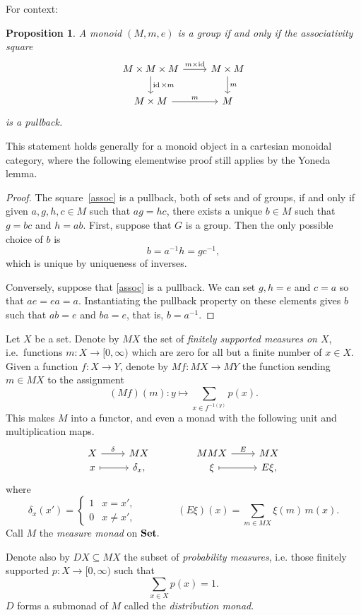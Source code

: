 \documentclass[a4paper,UKenglish,numberwithinsect,cleveref, autoref, thm-restate]{lipics-v2021}
\theoremstyle{plain} %
\newtheorem{myproposition}[mytheorem]{Proposition}
\theoremstyle{definition} %
\begin{document}
For context:
\begin{myproposition}\label{assoc_group}
 A monoid $(M,m,e)$ is a group if and only if the associativity square
 \begin{equation}\label{assoc}
  \begin{tikzcd}
   M \times M \times M \ar{d}{\id\times m} \ar{r}{m\times\id} & M\times M \ar{d}{m} \\
   M\times M \ar{r}{m} & M
  \end{tikzcd}
 \end{equation}
 is a pullback.
\end{myproposition}
This statement holds generally for a monoid object in a cartesian monoidal category, where the following elementwise proof still applies by the Yoneda lemma.
\begin{proof}
 The square~\eqref{assoc} is a pullback, both of sets and of groups, if and only if given $a,g,h,c\in M$ such that $ag=hc$, there exists a unique $b\in M$ such that $g=bc$ and $h=ab$.
 First, suppose that $G$ is a group. Then the only possible choice of $b$ is 
 \[
  b = a^{-1}h = gc^{-1},
 \]
 which is unique by uniqueness of inverses. 
 
 Conversely, suppose that \eqref{assoc} is a pullback. We can set $g,h=e$ and $c=a$ so that $ae=ea=a$. 
 Instantiating the pullback property on these elements gives $b$ such that $ab=e$ and $ba=e$, that is, $b=a^{-1}$.
\end{proof}
\begin{definition}\label{monadM}
 Let $X$ be a set. Denote by $MX$ the set of \emph{finitely supported measures on $X$}, i.e.~functions $m:X\to[0,\infty)$ which are zero for all but a finite number of $x\in X$. 
 Given a function $f:X\to Y$, denote by $Mf:MX\to MY$ the function sending $m\in MX$ to the assignment
 \[
	 (Mf)(m) : y \mapsto \sum_{x\in f^{-1(y)}} p(x) .
 \]
 This makes $M$ into a functor, and even a monad with the following unit and multiplication maps.
 \[
  \begin{tikzcd}[row sep=0]
   X \ar{r}{\delta} & MX \\
   x \ar[mapsto]{r} & \delta_x ,
  \end{tikzcd}
  \qquad\qquad
  \begin{tikzcd}[row sep=0]
   MMX \ar{r}{E} & MX \\
   \xi \ar[mapsto]{r} & E\xi ,
  \end{tikzcd}
 \]
 where 
 \[
  \delta_x(x') = \begin{cases}
                  1 & x=x' , \\
                  0 & x\ne x',
                 \end{cases}
 \qquad\qquad
 (E\xi)(x) = \sum_{m\in MX} \xi(m)\,m(x) .
 \]
 Call $M$ the \emph{measure monad} on $\mathbf{Set}.$

 Denote also by $DX\subseteq MX$ the subset of \emph{probability measures}, i.e. those finitely supported $p:X\to[0,\infty)$ such that
 \[
  \sum_{x\in X} p(x) = 1 .
 \]
 $D$ forms a submonad of $M$ called the \emph{distribution monad}.
\end{definition}
\end{document}
